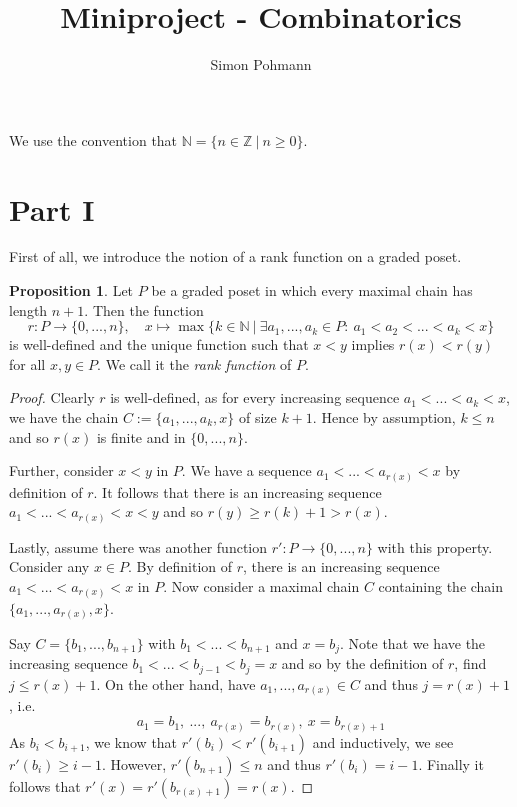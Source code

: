 \documentclass{scrartcl}
\title{Miniproject - Combinatorics}
\author{Simon Pohmann}
\date{}
\newcommand{\N}{\mathbb{N}}
\newcommand{\Z}{\mathbb{Z}}
\theoremstyle{definition}
\newtheorem{proposition}[definition]{Proposition}
\begin{document}
\maketitle

We use the convention that $\N = \{ n \in \Z \ | \ n \geq 0 \}$.

\section{Part I}
First of all, we introduce the notion of a rank function on a graded poset.
\begin{proposition}
    \label{prop:definition_rank_function}
    Let $P$ be a graded poset in which every maximal chain has length $n + 1$. Then the function
    \begin{equation*}
        r: P \to \{ 0, ..., n \}, \quad x \mapsto \max\{ k \in \N \ | \ \exists a_1, ..., a_k \in P: \ a_1 < a_2 < ... < a_k < x \}
    \end{equation*}
    is well-defined and the unique function such that $x < y$ implies $r(x) < r(y)$ for all $x, y \in P$.
    We call it the \emph{rank function} of $P$.
\end{proposition}
\begin{proof}
    Clearly $r$ is well-defined, as for every increasing sequence $a_1 < ... < a_k < x$, we have the chain $C := \{ a_1, ..., a_k, x \}$ of size $k + 1$.
    Hence by assumption, $k \leq n$ and so $r(x)$ is finite and in $\{ 0, ..., n \}$.

    Further, consider $x < y$ in $P$.
    We have a sequence $a_1 < ... < a_{r(x)} < x$ by definition of $r$.
    It follows that there is an increasing sequence $a_1 < ... < a_{r(x)} < x < y$ and so $r(y) \geq r(k) + 1 > r(x)$.

    Lastly, assume there was another function $r': P \to \{ 0, ..., n \}$ with this property.
    Consider any $x \in P$.
    By definition of $r$, there is an increasing sequence $a_1 < ... < a_{r(x)} < x$ in $P$.
    Now consider a maximal chain $C$ containing the chain $\{ a_1, ..., a_{r(x)}, x \}$.

    Say $C = \{ b_1, ..., b_{n + 1} \}$ with $b_1 < ... < b_{n + 1}$ and $x = b_j$.
    Note that we have the increasing sequence $b_1 < ... < b_{j - 1} < b_j = x$ and so by the definition of $r$, find $j \leq r(x) + 1$.
    On the other hand, have $a_1, ..., a_{r(x)} \in C$ and thus $j = r(x) + 1$, i.e.
    \begin{equation*}
        a_1 = b_1, \ ..., \ a_{r(x)} = b_{r(x)}, \ x = b_{r(x) + 1}
    \end{equation*}
    As $b_i < b_{i + 1}$, we know that $r'(b_i) < r'(b_{i + 1})$ and inductively, we see $r'(b_i) \geq i - 1$.
    However, $r'(b_{n + 1}) \leq n$ and thus $r'(b_i) = i - 1$.
    Finally it follows that $r'(x) = r'(b_{r(x) + 1}) = r(x)$.
\end{proof}
\end{document}
